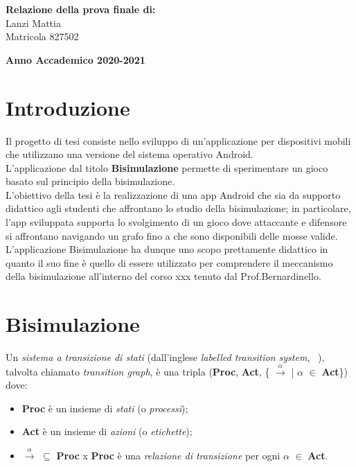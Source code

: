 \documentclass[a4paper,11pt,twoside,openright]{report}
\begin{document}
\begin{titlepage}
        \begin{flushright}
            {\large \textbf{Relazione della prova finale di:}} \\
            \large{Lanzi Mattia} \\
            \large{Matricola 827502} 
        \end{flushright}
        
        \vspace{40mm}
        \begin{center}
            {\large{\bf Anno Accademico 2020-2021}}
        \end{center}

        \restoregeometry
        
    \end{titlepage}

\tableofcontents

\chapter*{Introduzione}
Il progetto di tesi consiste nello sviluppo di un'applicazione per dispositivi mobili che utilizzano una versione del sistema operativo Android.\\
L'applicazione dal titolo \textbf{Bisimulazione} permette di sperimentare un gioco basato sul principio della bisimulazione.\\
L'obiettivo della tesi è la realizzazione di una app Android che sia da supporto didattico agli studenti che affrontano lo studio della bisimulazione; in particolare, l'app sviluppata supporta lo svolgimento di un gioco dove attaccante e difensore si affrontano navigando un grafo fino a che sono disponibili delle mosse valide.\\
L'applicazione Bisimulazione ha dunque uno scopo prettamente didattico in quanto il suo fine è quello di essere utilizzato per comprendere il meccanismo della bisimulazione all'interno del corso xxx tenuto dal Prof.Bernardinello.

\chapter{Bisimulazione}
Un \textit{sistema a transizione di stati} (dall'inglese \textit{labelled transition system}, ~\cite{1}), talvolta chiamato \textit{transition graph}, è una tripla (\textbf{Proc}, \textbf{Act}, \{ $\xrightarrow{\alpha}$ | $\alpha$ $\in$ \textbf{Act}\}) dove:

\begin{itemize}
\item \textbf{Proc} è un insieme di \textit{stati} (o \textit{processi});

\item \textbf{Act} è un insieme di \textit{azioni} (o \textit{etichette});

\item $\xrightarrow{\alpha}$ $\subseteq$ \textbf{Proc} x \textbf{Proc} è una \textit{relazione di transizione} per ogni $\alpha$ $\in$ \textbf{Act}.
\end{itemize}
\end{document}
